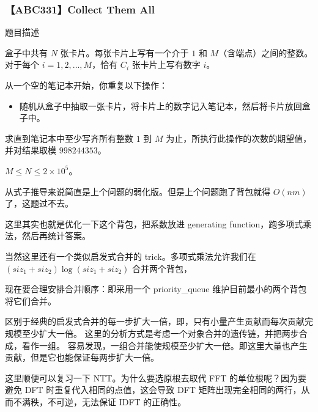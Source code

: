 \begin{frame}
  \frametitle{【ABC331】Collect Them All}

  \begin{block}{题目描述}
  
    盒子中共有 $N$ 张卡片。每张卡片上写有一个介于 $1$ 和 $M$（含端点）之间的整数。
    对于每个 $i = 1,2,\dots,M$，恰有 $C_i$ 张卡片上写有数字 $i$。

    从一个空的笔记本开始，你重复以下操作：
    \begin{itemize}
    \item 随机从盒子中抽取一张卡片，将卡片上的数字记入笔记本，然后将卡片放回盒子中。
    \end{itemize}

    求直到笔记本中至少写齐所有整数 $1$ 到 $M$ 为止，所执行此操作的次数的期望值，并对结果取模 $998244353$。

    $M\le N \le 2\times 10^{5}$。


  \end{block}  

\end{frame}

\begin{frame}

  从式子推导来说简直是上个问题的弱化版。但是上个问题跑了背包就得 $O(nm)$ 了，这题过不去。
  
  这里其实也就是优化一下这个背包，把系数放进 generating function，跑多项式乘法，然后再统计答案。

  当然这里还有一个类似启发式合并的 trick。多项式乘法允许我们在 $(siz_1+siz_2)\log(siz_1+siz_2)$ 合并两个背包，
  
  现在要合理安排合并顺序：即采用一个 priority_queue 维护目前最小的两个背包将它们合并。


  区别于经典的启发式合并的每一步扩大一倍，即，只有小量产生贡献而每次贡献完规模至少扩大一倍。
  这里的分析方式是考虑一个对象合并的遗传链，并把两步合成，看作一组。
  容易发现，一组合并能使规模至少扩大一倍。即这里大量也产生贡献，但是它也能保证每两步扩大一倍。
  
  这里顺便可以复习一下 NTT。为什么要选原根去取代 FFT 的单位根呢？因为要避免 DFT 时重复代入相同的点值，这会导致 DFT 矩阵出现完全相同的两行，从而不满秩，不可逆，无法保证 IDFT 的正确性。

\end{frame}